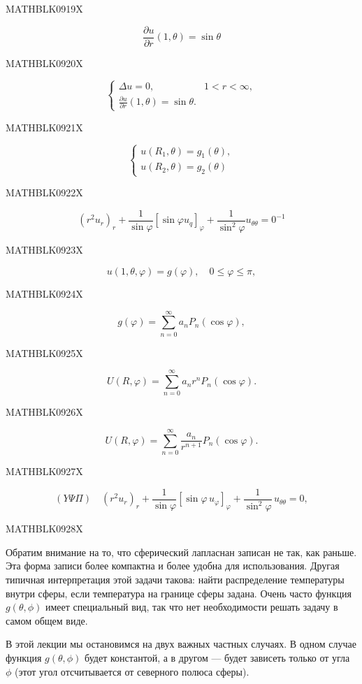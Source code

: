 \documentclass[
  ukrainian,
]{article}
\begin{document}
MATHBLK0919X

\[
\frac{\partial u}{\partial r}(1, \theta) = \sin \theta
\]

MATHBLK0920X

\[
\begin{cases} \Delta u = 0, & 1 < r < \infty, \\ \frac{\partial u}{\partial r}(1, \theta) = \sin \theta. \end{cases}
\]

MATHBLK0921X

\[
\begin{cases} u(R_1, \theta) = g_1(\theta), \\ u(R_2, \theta) = g_2(\theta) \end{cases}
\]

MATHBLK0922X

\[
(r^2u_r)_r + \frac{1}{\sin\varphi} \left[\sin\varphi u_q\right]_{\varphi} + \frac{1}{\sin^2\varphi} u_{\theta\theta} = 0^{-1}
\]

MATHBLK0923X

\[
u(1, \theta, \varphi) = g(\varphi), \quad 0 \le \varphi \le \pi,
\]

MATHBLK0924X

\[
g(\varphi) = \sum_{n=0}^{\infty} a_n P_n(\cos \varphi),
\]

MATHBLK0925X

\[
U(R, \varphi) = \sum_{n=0}^{\infty} a_n r^n P_n(\cos \varphi).
\]

MATHBLK0926X

\[
U(R, \varphi) = \sum_{n=0}^{\infty} \frac{a_n}{r^{n+1}} P_n(\cos \varphi).
\]

MATHBLK0927X

\[
(Y \Psi \Pi) \quad (r^2 u_r)_r + \frac{1}{\sin \varphi} [\sin \varphi \, u_\varphi]_\varphi + \frac{1}{\sin^2 \varphi} \, u_{\theta\theta} = 0,
\]

MATHBLK0928X

Обратим внимание на то, что сферический лапласнан записан не так, как
раньше. Эта форма записи более компактна и более удобна для
использования. Другая типичная интерпретация этой задачи такова: найти
распределение температуры внутри сферы, если температура на границе
сферы задана. Очень часто функция \(g(\theta, \phi)\) имеет специальный
вид, так что нет необходимости решать задачу в самом общем виде.

В этой лекции мы остановимся на двух важных частных случаях. В одном
случае функция \(g(\theta, \phi)\) будет константой, а в другом ---
будет зависеть только от угла \(\phi\) (этот угол отсчитывается от
северного полюса сферы).
\end{document}
